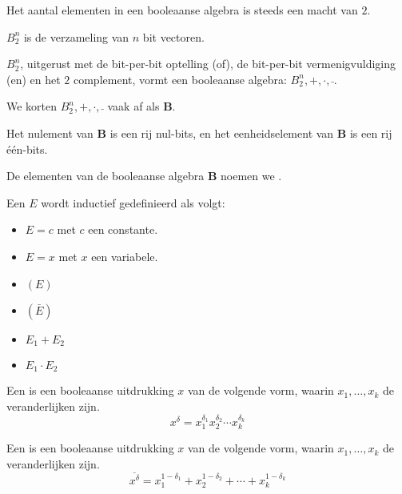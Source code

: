\documentclass[main.tex]{subfiles}
\begin{document}
\begin{gev}
  Het aantal elementen in een booleaanse algebra is steeds een macht van $2$.
\end{gev}

\begin{de}
  $B_{2}^{n}$ is de verzameling van $n$ bit vectoren.
\end{de}

\begin{st}
  $B_{2}^{n}$, uitgerust met de bit-per-bit optelling (of), de bit-per-bit vermenigvuldiging (en) en het $2$ complement, vormt een booleaanse algebra: $B_{2}^{n},+,\cdot,\bar{}$.
\end{st}

\begin{de}
  We korten $B_{2}^{n},+,\cdot,\bar{}$ vaak af als \textbf{B}.
\end{de}

\begin{opm}
  Het nulement van \textbf{B} is een rij nul-bits, en het eenheidselement van \textbf{B} is een rij \'e\'en-bits.
\end{opm}

\begin{de}
  De elementen van de booleaanse algebra \textbf{B} noemen we .
\end{de}

\begin{de}
  Een  $E$ wordt inductief gedefinieerd als volgt:
  \begin{itemize}
  \item $E = c$ met $c$ een constante.
  \item $E = x$ met $x$ een variabele.
  \item $(E)$
  \item $(\bar{E})$
  \item $E_{1} + E_{2}$
  \item $E_{1} \cdot E_{2}$
  \end{itemize}
\end{de}

\begin{de}
  Een  is een booleaanse uitdrukking $x$ van de volgende vorm, waarin $x_{1},\dotsc,x_{k}$ de veranderlijken zijn.
  \[ x^{\delta} = x_{1}^{\delta_{1}}x_{2}^{\delta_{2}}\dotsb x_{k}^{\delta_{k}} \]
\end{de}

\begin{de}
  Een  is een booleaanse uitdrukking $x$ van de volgende vorm, waarin $x_{1},\dotsc,x_{k}$ de veranderlijken zijn.
  \[ \overline{x^{\delta}} = x_{1}^{1-\delta_{1}}+x_{2}^{1-\delta_{2}}+\dotsb+ x_{k}^{1-\delta_{k}} \]
\end{de}
\end{document}
